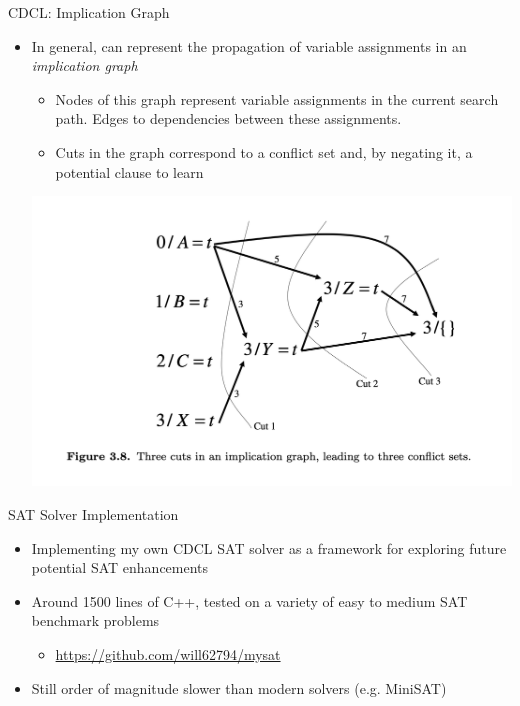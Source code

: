 \documentclass{beamer}
\begin{document}
\begin{frame}{CDCL: Implication Graph}
    \begin{itemize}
        \item In general, can represent the propagation of variable assignments in an \textit{implication graph}
        \pause
        \begin{itemize}
            \item Nodes of this graph represent variable assignments in the current search path. Edges to dependencies between these assignments.
            \item Cuts in the graph correspond to a conflict set and, by negating it, a potential clause to learn
        \end{itemize}
        \begin{center}
            \includegraphics[scale=0.3]{figures/implication-graph.png}
        \end{center}
\end{itemize}
\end{frame}


\begin{frame}{SAT Solver Implementation}
    \begin{itemize}[<+->]
        \item Implementing my own CDCL SAT solver as a framework for exploring future potential SAT enhancements
        \item Around 1500 lines of C++, tested on a variety of easy to medium SAT benchmark problems
        \begin{itemize}
            \item \url{https://github.com/will62794/mysat} 
        \end{itemize}
        \item Still order of magnitude slower than modern solvers (e.g. MiniSAT)
    \end{itemize}
\end{frame}
\end{document}
